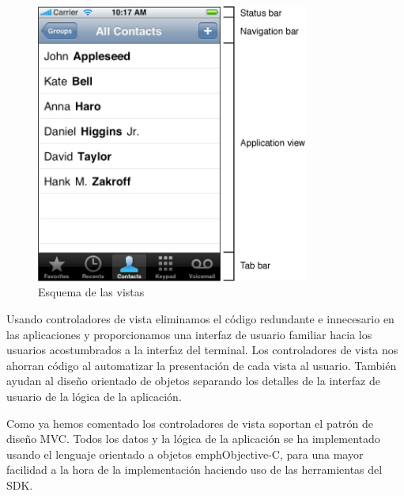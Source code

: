  \begin{figure} [h]
  \centering
    \includegraphics[width=0.8\textwidth]{./images/vc-areas.jpg}
  \caption{Esquema de las vistas }
  \label{fig:layout-of-views}
\end{figure} 
 
 Usando controladores de vista eliminamos el código redundante e innecesario en las aplicaciones %
  y proporcionamos una interfaz de usuario familiar %
  hacia los usuarios acostumbrados a la interfaz del terminal. %
 Los controladores de vista nos ahorran código al automatizar la presentación de cada vista al usuario. %
 También ayudan al diseño orientado de objetos separando los detalles de la interfaz de usuario de la lógica de la aplicación.
 
  Como ya hemos comentado los controladores de vista soportan el patrón de diseño MVC. %
  Todos los datos y la lógica de la aplicación se ha implementado usando el lenguaje orientado a objetos emph{Objective-C}, para una mayor facilidad a la hora de la implementación haciendo uso de las herramientas del SDK.%
  
